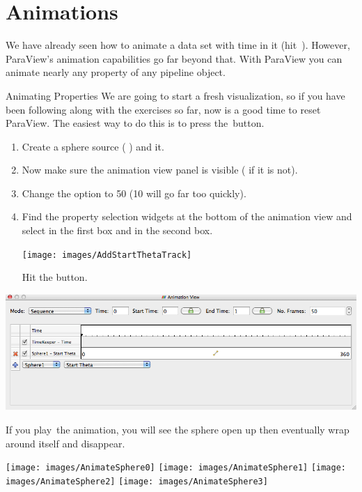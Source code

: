 \section{Animations}

We have already seen how to animate a data set with time in it
(hit~\vcrPlay).  However, ParaView's animation capabilities go far beyond
that.  With ParaView you can animate nearly any property of any pipeline
object.

\begin{exercise}{Animating Properties}
  \label{ex:AnimatingProperties}%
  We are going to start a fresh visualization, so if you have been
  following along with the exercises so far, now is a good time to reset
  ParaView.  The easiest way to do this is to press the~\disconnect button.

  \begin{enumerate}
  \item Create a sphere source ( \ra {}) and \apply it.
  \item Now make sure the animation view panel is visible ( \ra
     if it is not).
  \item Change the  option to 50 (10 will go far too quickly).
  \item Find the property selection widgets at the bottom of the animation
    view and select  in the first box and  in
    the second box.
    \begin{inlinefig}
      \texttt{[image: images/AddStartThetaTrack]}
    \end{inlinefig}
    Hit the  button.
  \end{enumerate}

  \begin{inlinefig}
    \includegraphics[width=.9\linewidth]{images/BuildAnimation1}
  \end{inlinefig}

  If you play~\vcrPlay the animation, you will see the sphere open up then
  eventually wrap around itself and disappear.

  \begin{inlinefig}
    \texttt{[image: images/AnimateSphere0]}
    \texttt{[image: images/AnimateSphere1]}
    \texttt{[image: images/AnimateSphere2]}
    \texttt{[image: images/AnimateSphere3]}
  \end{inlinefig}
\end{exercise}

